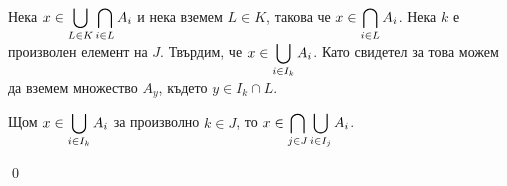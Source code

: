 \begin{problem}
\begin{tcolorbox}[mybox={Доказателство:}]
\quad
Нека $\displaystyle x \in \bigcup_{L \in K} \bigcap_{i \in L} A_i$ и нека вземем $L \in K$,
такова че $\displaystyle x \in \bigcap_{i \in L} A_i$.
Нека $k$ е произволен елемент на $J$.
Твърдим, че $\displaystyle x \in \bigcup_{i \in I_k} A_i$.
Като свидетел за това можем да вземем множество $A_y$, където $y \in I_k \cap L$.

\quad
Щом $\displaystyle x \in \bigcup_{i \in I_k} A_i$ за произволно $k \in J$,
то $\displaystyle x \in \bigcap_{j \in J} \bigcup_{i \in I_j} A_i$.

\qed
\end{tcolorbox}

\end{problem}
